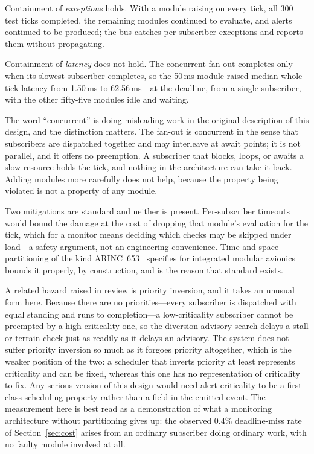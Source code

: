 \documentclass[conference]{IEEEtran}
\begin{document}
Containment of \emph{exceptions} holds. With a module raising on every tick,
all 300 test ticks completed, the remaining modules continued to evaluate, and
alerts continued to be produced; the bus catches per-subscriber exceptions and
reports them without propagating.

Containment of \emph{latency} does not hold. The concurrent fan-out completes
only when its slowest subscriber completes, so the 50\,ms module raised median
whole-tick latency from 1.50\,ms to 62.56\,ms---at the deadline, from a single
subscriber, with the other fifty-five modules idle and waiting.

The word ``concurrent'' is doing misleading work in the original description of
this design, and the distinction matters. The fan-out is concurrent in the
sense that subscribers are dispatched together and may interleave at await
points; it is not parallel, and it offers no preemption. A subscriber that
blocks, loops, or awaits a slow resource holds the tick, and nothing in the
architecture can take it back. Adding modules more carefully does not help,
because the property being violated is not a property of any module.

Two mitigations are standard and neither is present. Per-subscriber timeouts
would bound the damage at the cost of dropping that module's evaluation for
the tick, which for a monitor means deciding which checks may be skipped under
load---a safety argument, not an engineering convenience. Time and space
partitioning of the kind ARINC~653~\cite{arinc653} specifies for integrated
modular avionics bounds it properly, by construction, and is the reason that
standard exists.

A related hazard raised in review is priority inversion, and it takes an
unusual form here. Because there are no priorities---every subscriber is
dispatched with equal standing and runs to completion---a low-criticality
subscriber cannot be preempted by a high-criticality one, so the
diversion-advisory search delays a stall or terrain check just as readily as
it delays an advisory. The system does not suffer priority inversion so much
as it forgoes priority altogether, which is the weaker position of the two: a
scheduler that inverts priority at least represents criticality and can be
fixed, whereas this one has no representation of criticality to fix. Any
serious version of this design would need alert criticality to be a
first-class scheduling property rather than a field in the emitted event. The measurement here is best read as a demonstration of what
a monitoring architecture without partitioning gives up: the observed 0.4\%
deadline-miss rate of Section~\ref{sec:cost} arises from an ordinary
subscriber doing ordinary work, with no faulty module involved at all.
\end{document}
